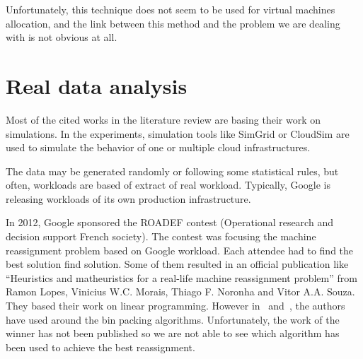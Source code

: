 Unfortunately, this technique does not seem to be used for virtual machines
allocation, and the link between this method and the problem we are dealing
with is not obvious at all.

\section{Real data analysis}

Most of the cited works in the literature review are basing their work on
simulations.  In the experiments, simulation tools like
SimGrid\cite{websiteSimgrid} or CloudSim\cite{websiteCloudsim} are used to simulate
the behavior of one or multiple cloud infrastructures.

The data may be generated randomly or following some statistical rules, but
often, workloads are based of extract of real workload. Typically, Google is
releasing workloads of its own production infrastructure. 

In 2012, Google sponsored the ROADEF contest (Operational research and decision
support French society)\cite{websiteRoadef}. The contest was focusing the machine
reassignment problem based on Google workload. Each attendee had to find the
best solution find solution. Some of them resulted in an official publication
like “Heuristics and matheuristics for a real-life machine reassignment
problem” from Ramon Lopes, Vinicius W.C. Morais, Thiago F. Noronha and Vitor
A.A. Souza\cite{roadefIp}.  They based their work on linear programming.
However in~\cite{roadefBp1} and~\cite{roadefBp2}, the authors have used
around the bin packing algorithms. Unfortunately, the work of the winner has
not been published so we are not able to see which algorithm has been used to
achieve the best reassignment.
